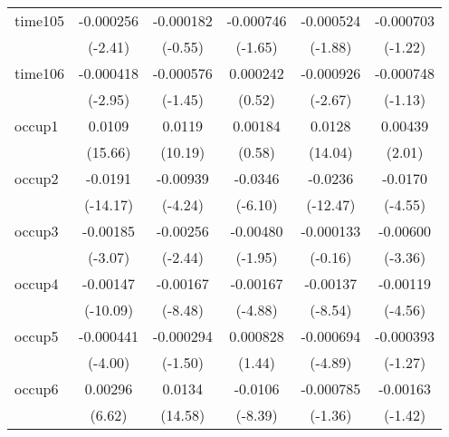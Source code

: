 \begin{table}[htbp]
\begin{tabular}{l*{5}{c}}
time105     &   -0.000256\sym{*}  &   -0.000182         &   -0.000746         &   -0.000524         &   -0.000703         \\
            &     (-2.41)         &     (-0.55)         &     (-1.65)         &     (-1.88)         &     (-1.22)         \\
time106     &   -0.000418\sym{**} &   -0.000576         &    0.000242         &   -0.000926\sym{**} &   -0.000748         \\
            &     (-2.95)         &     (-1.45)         &      (0.52)         &     (-2.67)         &     (-1.13)         \\
occup1      &      0.0109\sym{***}&      0.0119\sym{***}&     0.00184         &      0.0128\sym{***}&     0.00439\sym{*}  \\
            &     (15.66)         &     (10.19)         &      (0.58)         &     (14.04)         &      (2.01)         \\
occup2      &     -0.0191\sym{***}&    -0.00939\sym{***}&     -0.0346\sym{***}&     -0.0236\sym{***}&     -0.0170\sym{***}\\
            &    (-14.17)         &     (-4.24)         &     (-6.10)         &    (-12.47)         &     (-4.55)         \\
occup3      &    -0.00185\sym{**} &    -0.00256\sym{*}  &    -0.00480         &   -0.000133         &    -0.00600\sym{***}\\
            &     (-3.07)         &     (-2.44)         &     (-1.95)         &     (-0.16)         &     (-3.36)         \\
occup4      &    -0.00147\sym{***}&    -0.00167\sym{***}&    -0.00167\sym{***}&    -0.00137\sym{***}&    -0.00119\sym{***}\\
            &    (-10.09)         &     (-8.48)         &     (-4.88)         &     (-8.54)         &     (-4.56)         \\
occup5      &   -0.000441\sym{***}&   -0.000294         &    0.000828         &   -0.000694\sym{***}&   -0.000393         \\
            &     (-4.00)         &     (-1.50)         &      (1.44)         &     (-4.89)         &     (-1.27)         \\
occup6      &     0.00296\sym{***}&      0.0134\sym{***}&     -0.0106\sym{***}&   -0.000785         &    -0.00163         \\
            &      (6.62)         &     (14.58)         &     (-8.39)         &     (-1.36)         &     (-1.42)         \\

\end{tabular}
\end{table}
